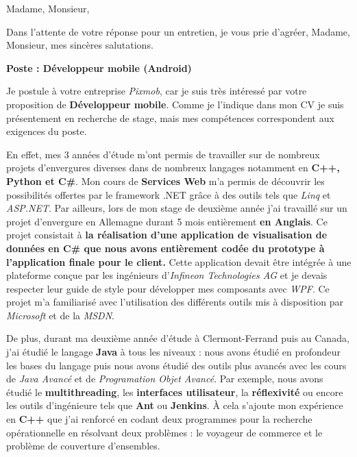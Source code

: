 \date{\today}
\opening{Madame, Monsieur,}
\closing{Dans l'attente de votre réponse pour un entretien, je vous prie d'agréer, Madame, Monsieur, mes sincères salutations.}

\makelettertitle

\textbf{Poste : Développeur mobile (Android)}

\introduction{}
Je postule à votre entreprise \textit{Pixmob}, car je suis très intéressé par votre proposition de \textbf{Développeur mobile}. Comme je l'indique dans mon CV je suis présentement en recherche de stage, mais mes compétences correspondent aux exigences du poste.

En effet, mes 3 années d'étude m'ont permis de travailler sur de nombreux projets d'envergures diverses dans de nombreux langages notamment en \textbf{C++, Python et C\#}. Mon cours de \textbf{Services Web} m'a permis de découvrir les possibilités offertes par le framework .NET grâce à des outils tels que \textit{Linq} et \textit{ASP.NET}. Par ailleurs, lors de mon stage de deuxième année j'ai travaillé sur un projet d'envergure en Allemagne durant 5 mois entièrement \textbf{en Anglais}. Ce projet consistait à \textbf{la réalisation d'une application de visualisation de données en C\# que nous avons entièrement codée du prototype à l'application finale pour le client.} Cette application devait être intégrée à une plateforme conçue par les ingénieurs d'\textit{Infineon Technologies AG} et je devais respecter leur guide de style pour développer mes composants avec \textit{WPF}. Ce projet m'a familiarisé avec l'utilisation des différents outils mis à disposition par \textit{Microsoft} et de la \textit{MSDN}.

De plus, durant ma deuxième année d'étude à Clermont-Ferrand puis au Canada, j'ai étudié le langage \textbf{Java} à tous les niveaux : nous avons étudié en profondeur les bases du langage puis nous avons étudié des outils plus avancés avec les cours de \textit{Java Avancé} et de \textit{Programation Objet Avancé}. Par exemple, nous avons étudié le \textbf{multithreading}, les \textbf{interfaces utilisateur}, la \textbf{réflexivité} ou encore les outils d'ingénieure tels que \textbf{Ant} ou \textbf{Jenkins}. À cela s'ajoute mon expérience en \textbf{C++} que j'ai renforcé en codant deux programmes pour la recherche opérationnelle en résolvant deux problèmes : le voyageur de commerce et le problème de couverture d'ensembles.

